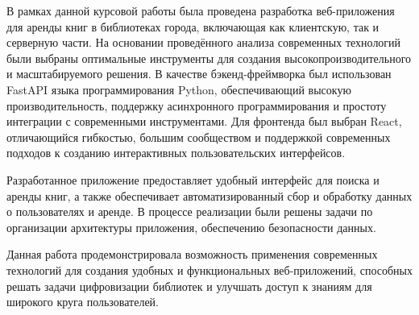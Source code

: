 \conclusion

В рамках данной курсовой работы была проведена разработка веб-приложения для аренды книг в библиотеках города, включающая как клиентскую, так и серверную части. На основании проведённого анализа современных технологий были выбраны оптимальные инструменты для создания высокопроизводительного и масштабируемого решения. В качестве бэкенд-фреймворка был использован FastAPI языка программирования Python, обеспечивающий высокую производительность, поддержку асинхронного программирования и простоту интеграции с современными инструментами. Для фронтенда был выбран React, отличающийся гибкостью, большим сообществом и поддержкой современных подходов к созданию интерактивных пользовательских интерфейсов.

Разработанное приложение предоставляет удобный интерфейс для поиска и аренды книг, а также обеспечивает автоматизированный сбор и обработку данных о пользователях и аренде. В процессе реализации были решены задачи по организации архитектуры приложения, обеспечению безопасности данных.

Данная работа продемонстрировала возможность применения современных технологий для создания удобных и функциональных веб-приложений, способных решать задачи цифровизации библиотек и улучшать доступ к знаниям для широкого круга пользователей.

